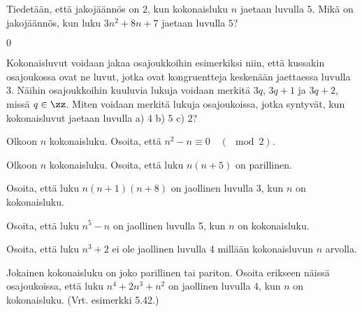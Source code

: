 \begin{tehtavasivu}
\begin{tehtava}
	Tiedetään, että jakojäännös on $2$, kun kokonaisluku $n$ jaetaan luvulla $5$. Mikä on jakojäännös, kun luku $3n^2 + 8n + 7$ jaetaan luvulla $5$?
	\begin{vastaus}
	$0$
	\end{vastaus}
\end{tehtava}

\begin{tehtava}
	Kokonaisluvut voidaan jakaa osajoukkoihin esimerkiksi niin, että kussakin osajoukossa ovat ne luvut, jotka ovat kongruentteja keskenään jaettaessa luvulla 3. Näihin osajoukkoihin kuuluvia lukuja voidaan merkitä $3q$, $3q + 1$ ja $3q + 2$, missä $q \in \zz$. Miten voidaan merkitä lukuja osajoukoissa, jotka syntyvät, kun kokonaisluvut jaetaan luvulla a) $4$ b) $5$ c) $2$?
	\begin{vastaus}
	\end{vastaus}
\end{tehtava}

\begin{tehtava}
	Olkoon $n$ kokonaisluku. Osoita, että $n^2 - n \equiv 0\quad (\mod 2)$.
\end{tehtava}

\begin{tehtava}
	Olkoon $n$ kokonaisluku. Osoita, että luku $n(n + 5)$ on parillinen.
\end{tehtava}

\begin{tehtava}
	Osoita, että luku $n(n + 1)(n + 8)$ on jaollinen luvulla 3, kun $n$ on kokonaisluku.
\end{tehtava}

\begin{tehtava}
	Osoita, että luku $n^5 - n$ on jaollinen luvulla 5, kun $n$ on kokonaisluku.
\end{tehtava}

\begin{tehtava}
	Osoita, että luku $n^3 + 2$ ei ole jaollinen luvulla 4 millään kokonaisluvun $n$ arvolla.
\end{tehtava}

\begin{tehtava}
	Jokainen kokonaisluku on joko parillinen tai pariton. Osoita erikseen näissä osajoukoissa, että luku $n^4 + 2n^3 + n^2$ on jaollinen luvulla $4$, kun $n$ on kokonaisluku. (Vrt. esimerkki 5.42.)
\end{tehtava}


\end{tehtavasivu}
